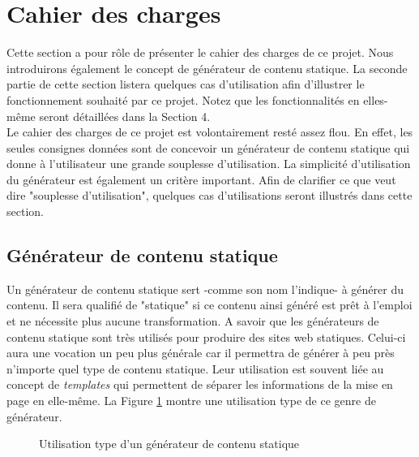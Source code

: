 \section{Cahier des charges}

	Cette section a pour rôle de présenter le cahier des charges de ce projet. Nous introduirons également le concept de générateur de contenu statique. La seconde partie de cette section listera quelques cas d'utilisation afin d'illustrer le fonctionnement souhaité par ce projet. Notez que les fonctionnalités en elles-même seront détaillées dans la Section 4.\\
	
	Le cahier des charges de ce projet est volontairement resté assez flou. En effet, les seules consignes données sont de concevoir un générateur de contenu statique qui donne à l'utilisateur une grande souplesse d'utilisation. La simplicité d'utilisation du générateur est également un critère important. Afin de clarifier ce que veut dire "souplesse d'utilisation", quelques cas d'utilisations seront illustrés dans cette section.\\
	
	
	\subsection{Générateur de contenu statique}
	
		Un générateur de contenu statique sert -comme son nom l'indique- à générer du contenu. Il sera qualifié de "statique" si ce contenu ainsi généré est prêt à l'emploi et ne nécessite plus aucune transformation. A savoir que les générateurs de contenu statique sont très utilisés pour produire des sites web statiques. Celui-ci aura une vocation un peu plus générale car il permettra de générer à peu près n'importe quel type de contenu statique. Leur utilisation est souvent liée au concept de \textit{templates} qui permettent de séparer les informations de la mise en page en elle-même. La Figure \ref{fig:use_of_generator} montre une utilisation type de ce genre de générateur.\\
		
		\begin{figure}
			\begin{center}
			\caption{Utilisation type d'un générateur de contenu statique}
			\label{fig:use_of_generator}
			\end{center}
		\end{figure}

